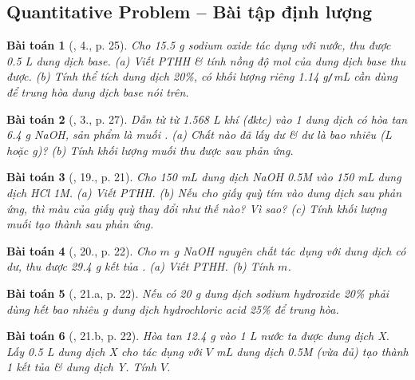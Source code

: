 \documentclass{article}
\newtheorem{baitoan}{Bài toán}
\begin{document}
\subsection{Quantitative Problem -- Bài tập định lượng}

\begin{baitoan}[\cite{SGK_Hoa_Hoc_9}, 4., p. 25]
	Cho \emph{15.5 g} sodium oxide \emph{} tác dụng với nước, thu được \emph{0.5 L} dung dịch base. (a) Viết PTHH \& tính nồng độ mol của dung dịch base thu được. (b) Tính thể tích dung dịch \emph{ 20\%}, có khối lượng riêng \emph{1.14 g\texttt{/}mL} cần dùng để trung hòa dung dịch base nói trên.
\end{baitoan}

\begin{baitoan}[\cite{SGK_Hoa_Hoc_9}, 3., p. 27]
	Dẫn từ từ \emph{1.568 L} khí \emph{} (đktc) vào 1 dung dịch có hòa tan \emph{6.4 g NaOH}, sản phẩm là muối \emph{}. (a) Chất nào đã lấy dư \& dư là bao nhiêu (\emph{L} hoặc \emph{g})? (b) Tính khối lượng muối thu được sau phản ứng.
\end{baitoan}

\begin{baitoan}[\cite{An_350_BT_Hoa_Hoc_9}, 19., p. 21]
	Cho \emph{150 mL} dung dịch \emph{NaOH 0.5M} vào \emph{150 mL} dung dịch \emph{HCl 1M}. (a) Viết PTHH. (b) Nếu cho giấy quỳ tím vào dung dịch sau phản ứng, thì màu của giấy quỳ thay đổi như thế nào? Vì sao? (c) Tính khối lượng muối tạo thành sau phản ứng.
\end{baitoan}

\begin{baitoan}[\cite{An_350_BT_Hoa_Hoc_9}, 20., p. 22]
	Cho $m$ \emph{g NaOH} nguyên chất tác dụng với dung dịch \emph{} có dư, thu được \emph{29.4 g} kết tủa \emph{}. (a) Viết PTHH. (b) Tính $m$.
\end{baitoan}

\begin{baitoan}[\cite{An_350_BT_Hoa_Hoc_9}, 21.a, p. 22]
	Nếu có \emph{20 g} dung dịch sodium hydroxide \emph{20\%} phải dùng hết bao nhiêu \emph{g} dung dịch hydrochloric acid \emph{25\%} để trung hòa.
\end{baitoan}

\begin{baitoan}[\cite{An_350_BT_Hoa_Hoc_9}, 21.b, p. 22]
	Hòa tan \emph{12.4 g } vào \emph{1 L} nước ta được dung dịch X. Lấy \emph{0.5 L} dung dịch X cho tác dụng với $V$ \emph{mL} dung dịch \emph{ 0.5M} (vừa đủ) tạo thành 1 kết tủa \& dung dịch Y. Tính $V$.
\end{baitoan}
\end{document}

